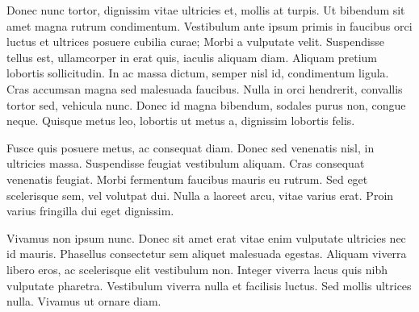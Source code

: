 \documentclass[sigconf]{acmart} %
\begin{document}
Donec nunc tortor, dignissim vitae ultricies et, mollis at turpis. Ut bibendum sit amet magna rutrum condimentum. Vestibulum ante ipsum primis in faucibus orci luctus et ultrices posuere cubilia curae; Morbi a vulputate velit. Suspendisse tellus est, ullamcorper in erat quis, iaculis aliquam diam. Aliquam pretium lobortis sollicitudin. In ac massa dictum, semper nisl id, condimentum ligula. Cras accumsan magna sed malesuada faucibus. Nulla in orci hendrerit, convallis tortor sed, vehicula nunc. Donec id magna bibendum, sodales purus non, congue neque. Quisque metus leo, lobortis ut metus a, dignissim lobortis felis.

Fusce quis posuere metus, ac consequat diam. Donec sed venenatis nisl, in ultricies massa. Suspendisse feugiat vestibulum aliquam. Cras consequat venenatis feugiat. Morbi fermentum faucibus mauris eu rutrum. Sed eget scelerisque sem, vel volutpat dui. Nulla a laoreet arcu, vitae varius erat. Proin varius fringilla dui eget dignissim.

Vivamus non ipsum nunc. Donec sit amet erat vitae enim vulputate ultricies nec id mauris. Phasellus consectetur sem aliquet malesuada egestas. Aliquam viverra libero eros, ac scelerisque elit vestibulum non. Integer viverra lacus quis nibh vulputate pharetra. Vestibulum viverra nulla et facilisis luctus. Sed mollis ultrices nulla. Vivamus ut ornare diam.
\end{document}
